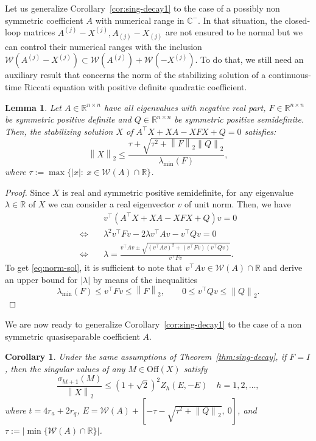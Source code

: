\documentclass[a4paper,10pt]{article}
\newcommand{\norm}[1]{\left\lVert#1\right\rVert}
\newtheorem{lemma}[definition]{Lemma}
\newtheorem{corollary}[definition]{Corollary}
\begin{document}
Let us generalize Corollary~\ref{cor:sing-decay1} to the case of a possibly non symmetric coefficient $A$ with numerical range in $\mathbb C^{-}$. In that situation, the closed-loop matrices $A^{(j)}-X^{(j)},A_{(j)}-X_{(j)}$  are not ensured to be normal but we can control their numerical ranges with the inclusion $\mathcal W(A^{(j)}-X^{(j)})\subset \mathcal W(A^{(j)})+\mathcal W(-X^{(j)})$. To do that, we still need  an auxiliary result that concerns the norm of the stabilizing solution of a continuous-time Riccati equation with positive definite quadratic coefficient.
\begin{lemma}\label{lem:sol-norm}
	Let $A\in\mathbb R^{n\times n}$ have all eigenvalues with negative real part, $F\in\mathbb R^{n\times n}$ be symmetric positive definite and $Q\in\mathbb R^{n\times n}$ be symmetric positive semidefinite. Then, the stabilizing solution $X$ of $A^\top X+XA-XFX+Q=0$ satisfies:
	\begin{equation}\label{eq:norm-sol}
		\norm{X}_2\leq \frac{\tau +\sqrt{\tau^2+\norm{F}_2\norm{Q}_2}}{\lambda_{\min}(F)},
	\end{equation}
	where $\tau:=\max \{|x|:\ x\in\mathcal W(A) \cap \mathbb R\}$.
\end{lemma}
\begin{proof}
	Since $X$ is real and symmetric positive semidefinite, for any eigenvalue $\lambda\in\mathbb R$ of $X$ we can consider a real eigenvector $v$ of unit norm. Then, we have
	\begin{align*}
		&\quad v^\top(A^\top X+XA-XFX+Q)v=0\\
		\Leftrightarrow&\quad \lambda^2 v^\top Fv-2\lambda v^\top Av - v^\top Qv=0\\
		\Leftrightarrow&\quad \lambda=\frac{v^\top Av\pm \sqrt{(v^\top Av)^2+ (v^\top Fv)(v^\top Qv)}}{v^\top Fv}.
	\end{align*}
	To get \eqref{eq:norm-sol}, it is sufficient to note that $v^\top Av\in\mathcal W(A)\cap \mathbb R$ and derive an upper bound for $|\lambda|$ by means of the inequalities
	$$
	\lambda_{\min}(F)\le v^\top Fv\le \norm{F}_2,\qquad 0\le v^\top Qv\le \norm{Q}_2. 
	$$
\end{proof}
We are now ready to generalize Corollary~\ref{cor:sing-decay1} to the case of a non symmetric quasiseparable coefficient $A$.
\begin{corollary}\label{cor:sing-decay2}
	Under the same assumptions of Theorem~\ref{thm:sing-decay}, if $F=I$, then the singular values of any $M\in\mathrm{Off}(X)$ satisfy
	$$
	\frac{\sigma_{ht+1}(M)}{\norm{X}_2}\le (1+\sqrt{2})^2
	Z_h(E,-E)
	\quad h=1,2,\dots,
	$$
	where $t=4r_a+2r_q$, $E=\mathcal W(A) + \left[-\tau -\sqrt{\tau^2+\norm{Q}_2},\ 0\right]$, and $\tau:= |\min\{\mathcal W(A)\cap \mathbb R\}|$.
\end{corollary}
\end{document}
